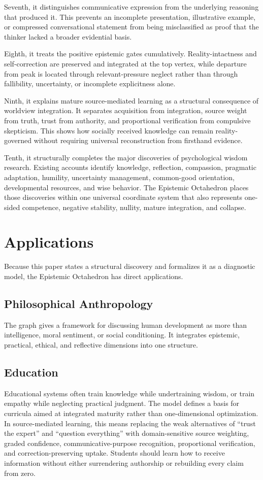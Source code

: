 \documentclass[11pt]{article}
\begin{document}
Seventh, it distinguishes communicative expression from the underlying reasoning that produced it. This prevents an incomplete presentation, illustrative example, or compressed conversational statement from being misclassified as proof that the thinker lacked a broader evidential basis.

Eighth, it treats the positive epistemic gates cumulatively. Reality-intactness and self-correction are preserved and integrated at the top vertex, while departure from peak is located through relevant-pressure neglect rather than through fallibility, uncertainty, or incomplete explicitness alone.

Ninth, it explains mature source-mediated learning as a structural consequence of worldview integration. It separates acquisition from integration, source weight from truth, trust from authority, and proportional verification from compulsive skepticism. This shows how socially received knowledge can remain reality-governed without requiring universal reconstruction from firsthand evidence.

Tenth, it structurally completes the major discoveries of psychological wisdom research. Existing accounts identify knowledge, reflection, compassion, pragmatic adaptation, humility, uncertainty management, common-good orientation, developmental resources, and wise behavior. The Epistemic Octahedron places those discoveries within one universal coordinate system that also represents one-sided competence, negative stability, nullity, mature integration, and collapse.

\section{Applications}

Because this paper states a structural discovery and formalizes it as a diagnostic model, the Epistemic Octahedron has direct applications.

\subsection{Philosophical Anthropology}
The graph gives a framework for discussing human development as more than intelligence, moral sentiment, or social conditioning. It integrates epistemic, practical, ethical, and reflective dimensions into one structure.

\subsection{Education}
Educational systems often train knowledge while undertraining wisdom, or train empathy while neglecting practical judgment. The model defines a basis for curricula aimed at integrated maturity rather than one-dimensional optimization. In source-mediated learning, this means replacing the weak alternatives of ``trust the expert'' and ``question everything'' with domain-sensitive source weighting, graded confidence, communicative-purpose recognition, proportional verification, and correction-preserving uptake. Students should learn how to receive information without either surrendering authorship or rebuilding every claim from zero.
\end{document}
